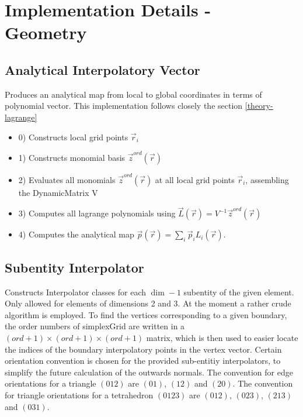 \section{Implementation Details - Geometry}
\label{impl-geometry}

\subsection{Analytical Interpolatory Vector}
\label{impl-geometry-analytical-vector}

\noindent
Produces an analytical map from local to global coordinates in terms of polynomial vector. This implementation follows closely the section \ref{theory-lagrange}

\begin{itemize}
  \item 0) Constructs local grid points $\vec{r}_i$
  \item 1) Constructs monomial basis $\vec{z}^{ord}(\vec{r})$
  \item 2) Evaluates all monomials $\vec{z}^{ord}(\vec{r})$ at all local grid points $\vec{r}_i$, assembling the DynamicMatrix V
  \item 3) Computes all lagrange polynomials using $\vec{L}(\vec{r}) = V^{-1} \vec{z}^{ord}(\vec{r})$
  \item 4) Computes the analytical map $\vec{p}(\vec{r}) = \sum_i \vec{p}_i L_i (\vec{r})$.
\end{itemize}

\subsection{Subentity Interpolator}
\label{impl-geometry-subentity-interpolator}

\noindent
Constructs Interpolator classes for each $\dim - 1$ subentity of the given element. Only allowed for elements of dimensions 2 and 3. At the moment a rather crude algorithm is employed. To find the vertices corresponding to a given boundary, the order numbers of simplexGrid are written in a $(ord + 1) \times (ord + 1) \times (ord + 1)$ matrix, which is then used to easier locate the indices of the boundary interpolatory points in the vertex vector. Certain orientation convention is chosen for the provided sub-entitiy interpolators, to simplify the future calculation of the outwards normals. The convention for edge orientations for a triangle $(012)$ are $(01)$, $(12)$ and $(20)$. The convention for triangle orientations for a tetrahedron $(0123)$ are $(012)$, $(023)$, $(213)$ and $(031)$.



